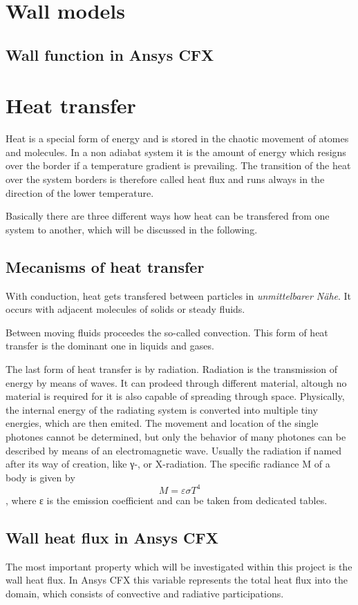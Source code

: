 \section{Wall models}
\subsection{Wall function in Ansys CFX}
\section{Heat transfer}
Heat is a special form of energy and is stored in the chaotic movement of atomes and molecules. In a non adiabat system it is the amount of energy which resigns over the border if a temperature gradient is prevailing. The transition of the heat over the system borders is therefore called heat flux and runs always in the direction of the lower temperature.

Basically there are three different ways how heat can be transfered from one system to another, which will be discussed in the following.
\subsection{Mecanisms of heat transfer}
With conduction, heat gets transfered between particles in \emph{unmittelbarer Nähe}. It occurs with adjacent molecules of solids or steady fluids.

Between moving fluids proceedes the so-called convection. This form of heat transfer is the dominant one in liquids and gases.

The last form of heat transfer is by radiation. Radiation is the transmission of energy by means of waves. It can prodeed through different material, altough no material is required for it is also capable of spreading through space. Physically, the internal energy of the radiating system is converted into multiple tiny energies, which are then emited. The movement and location of the single photones cannot be determined, but only the behavior of many photones can be described by means of an electromagnetic wave. Usually the radiation if named after its way of creation, like γ-, or X-radiation. 
The specific radiance M of a body is given by
\begin{equation}
M = \varepsilon \sigma T^4
\end{equation},
where ε is the emission coefficient and can be taken from dedicated tables.
\subsection{Wall heat flux in Ansys CFX}
The most important property which will be investigated within this project is the wall heat flux. In Ansys CFX this variable represents the total heat flux into the domain, which consists of convective and radiative participations.

